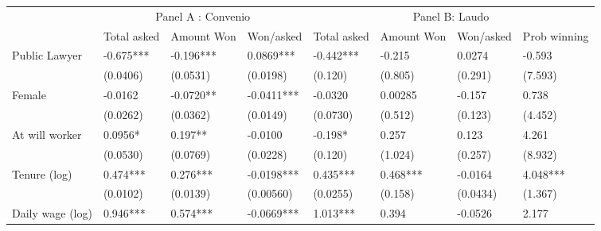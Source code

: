 \begin{tabular}{lccc|cccc}
      & \multicolumn{3}{c}{Panel A : Convenio} & \multicolumn{4}{c}{Panel B: Laudo} \\
\cmidrule{2-8}      & Total asked & Amount Won & Won/asked & Total asked & Amount Won & Won/asked & Prob winning \\
\cmidrule{2-8}Public Lawyer & \multicolumn{1}{l}{-0.675***} & \multicolumn{1}{l}{-0.196***} & \multicolumn{1}{l|}{0.0869***} & \multicolumn{1}{l}{-0.442***} & \multicolumn{1}{l}{-0.215} & \multicolumn{1}{l}{0.0274} & \multicolumn{1}{l}{-0.593} \\
      & \multicolumn{1}{l}{(0.0406)} & \multicolumn{1}{l}{(0.0531)} & \multicolumn{1}{l|}{(0.0198)} & \multicolumn{1}{l}{(0.120)} & \multicolumn{1}{l}{(0.805)} & \multicolumn{1}{l}{(0.291)} & \multicolumn{1}{l}{(7.593)} \\
Female & \multicolumn{1}{l}{-0.0162} & \multicolumn{1}{l}{-0.0720**} & \multicolumn{1}{l|}{-0.0411***} & \multicolumn{1}{l}{-0.0320} & \multicolumn{1}{l}{0.00285} & \multicolumn{1}{l}{-0.157} & \multicolumn{1}{l}{0.738} \\
      & \multicolumn{1}{l}{(0.0262)} & \multicolumn{1}{l}{(0.0362)} & \multicolumn{1}{l|}{(0.0149)} & \multicolumn{1}{l}{(0.0730)} & \multicolumn{1}{l}{(0.512)} & \multicolumn{1}{l}{(0.123)} & \multicolumn{1}{l}{(4.452)} \\
At will worker & \multicolumn{1}{l}{0.0956*} & \multicolumn{1}{l}{0.197**} & \multicolumn{1}{l|}{-0.0100} & \multicolumn{1}{l}{-0.198*} & \multicolumn{1}{l}{0.257} & \multicolumn{1}{l}{0.123} & \multicolumn{1}{l}{4.261} \\
      & \multicolumn{1}{l}{(0.0530)} & \multicolumn{1}{l}{(0.0769)} & \multicolumn{1}{l|}{(0.0228)} & \multicolumn{1}{l}{(0.120)} & \multicolumn{1}{l}{(1.024)} & \multicolumn{1}{l}{(0.257)} & \multicolumn{1}{l}{(8.932)} \\
Tenure (log) & \multicolumn{1}{l}{0.474***} & \multicolumn{1}{l}{0.276***} & \multicolumn{1}{l|}{-0.0198***} & \multicolumn{1}{l}{0.435***} & \multicolumn{1}{l}{0.468***} & \multicolumn{1}{l}{-0.0164} & \multicolumn{1}{l}{4.048***} \\
      & \multicolumn{1}{l}{(0.0102)} & \multicolumn{1}{l}{(0.0139)} & \multicolumn{1}{l|}{(0.00560)} & \multicolumn{1}{l}{(0.0255)} & \multicolumn{1}{l}{(0.158)} & \multicolumn{1}{l}{(0.0434)} & \multicolumn{1}{l}{(1.367)} \\
Daily wage (log) & \multicolumn{1}{l}{0.946***} & \multicolumn{1}{l}{0.574***} & \multicolumn{1}{l|}{-0.0669***} & \multicolumn{1}{l}{1.013***} & \multicolumn{1}{l}{0.394} & \multicolumn{1}{l}{-0.0526} & \multicolumn{1}{l}{2.177} \\

\end{tabular}
